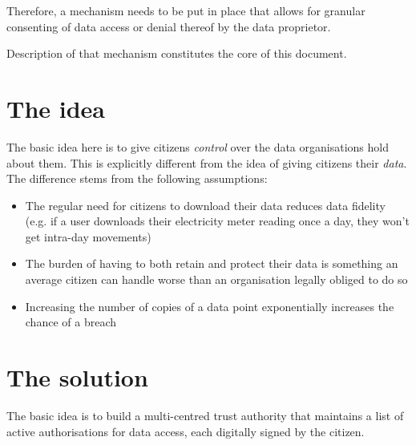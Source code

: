 \documentclass[nobib]{tufte-handout}
\begin{document}
Therefore, a mechanism needs to be put in place that allows for granular consenting of data access or denial thereof by the data proprietor. 

Description of that mechanism constitutes the core of this document. 

\section{The idea}
The basic idea here is to give citizens \emph{control} over the data organisations hold about them. This is explicitly different from the idea of giving citizens their \emph{data}. The  difference stems from the following assumptions:
\begin{itemize}
	\item The regular need for citizens to download their data reduces data fidelity (e.g. if a user downloads their electricity meter reading once a day, they won't get intra-day movements)
	\item The burden of having to both retain and protect their data is something an average citizen can handle worse than an organisation legally obliged to do so
	\item Increasing the number of copies  of a data point exponentially increases the chance of a breach
\end{itemize}

\section{The solution}
The basic idea is to build a multi-centred trust authority that maintains a list of active authorisations for data access, each digitally signed by the citizen.
\end{document}

